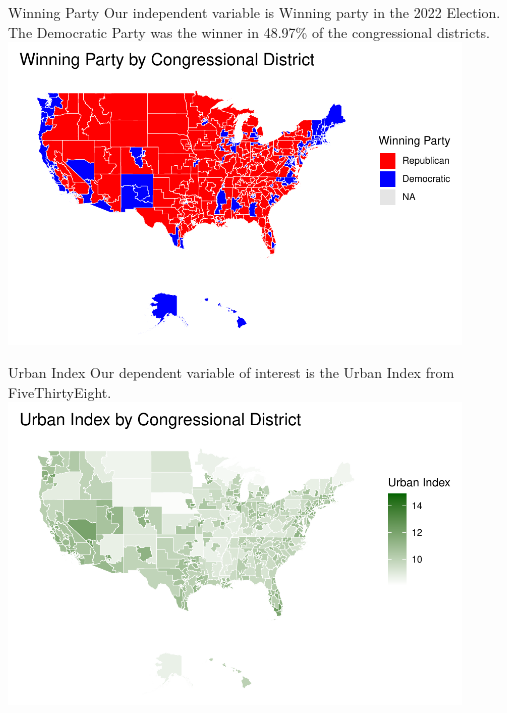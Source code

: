 \documentclass{beamer}
\begin{document}
\begin{frame}{Winning Party}
Our independent variable is Winning party in the 2022 Election. The Democratic Party was the winner in 48.97\% of the congressional districts.
 \includegraphics[width=0.9\textwidth]{plots/party_map.pdf}
\end{frame} 


\begin{frame}{Urban Index}
Our dependent variable of interest is the Urban Index from FiveThirtyEight.
 \includegraphics[width=0.9\textwidth]{plots/urbanindexmap.pdf}
\end{frame} 
\end{document}
